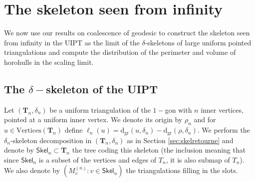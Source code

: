 \documentclass[AHL,XML,longabstracts,Unicode,NoSaveZebib]{cedram}
\begin{document}
\section{The skeleton seen from infinity} \label{sec:skelinfinity}
We now use our results on coalescence of geodesic to construct the skeleton seen from infinity in the UIPT as the limit of the $\delta$-skeletons of  large uniform pointed triangulations and compute the distribution of the perimeter and volume of horohulls in the scaling limit.

\subsection{The \texorpdfstring{$\delta-$}{delta-}skeleton of the UIPT}

Let $( \mathbf{T}_{n}, \delta_{n})$ be a uniform triangulation of the $1-$gon with $n$ inner vertices, pointed at a uniform inner vertex. We denote its origin by $\rho_{n}$ and  for $u \in \mathrm{Vertices}( \mathbf{T}_{n})$ define $\ell_{n}(u) = \mathrm{d_{gr}}(u, \delta_{n})- \mathrm{d_{gr}}(\rho, \delta_{n})$. We perform the $\delta_n$-skeleton decomposition in $(\mathbf{T}_{n},\delta_n)$ as in Section \ref{sec:skelretourne} and denote by  $ \mathsf{Skel}_{n} \subset \mathbf{T}_{n}$ the tree coding this skeleton (the inclusion meaning that since $\mathsf{Skel}_n$ is a subset of the vertices and edges of $T_n$, it is also submap of $T_n$). We also denote by $(M^{(n)}_{v} : v \in \mathsf{Skel}_{n})$ the triangulations filling in the slots. %
\end{document}
